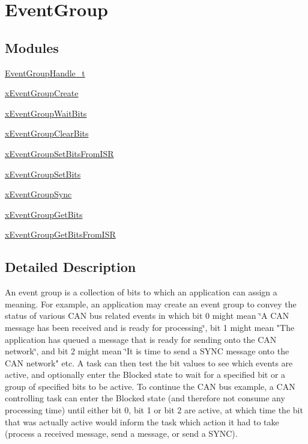 \hypertarget{group___event_group}{}\section{Event\+Group}
\label{group___event_group}
\subsection*{Modules}
\begin{DoxyCompactItemize}
\item 
\hyperlink{group___event_group_handle__t}{Event\+Group\+Handle\+\_\+t}
\item 
\hyperlink{group__x_event_group_create}{x\+Event\+Group\+Create}
\item 
\hyperlink{group__x_event_group_wait_bits}{x\+Event\+Group\+Wait\+Bits}
\item 
\hyperlink{group__x_event_group_clear_bits}{x\+Event\+Group\+Clear\+Bits}
\item 
\hyperlink{group__x_event_group_set_bits_from_i_s_r}{x\+Event\+Group\+Set\+Bits\+From\+I\+SR}
\item 
\hyperlink{group__x_event_group_set_bits}{x\+Event\+Group\+Set\+Bits}
\item 
\hyperlink{group__x_event_group_sync}{x\+Event\+Group\+Sync}
\item 
\hyperlink{group__x_event_group_get_bits}{x\+Event\+Group\+Get\+Bits}
\item 
\hyperlink{group__x_event_group_get_bits_from_i_s_r}{x\+Event\+Group\+Get\+Bits\+From\+I\+SR}
\end{DoxyCompactItemize}


\subsection{Detailed Description}
An event group is a collection of bits to which an application can assign a meaning. For example, an application may create an event group to convey the status of various C\+AN bus related events in which bit 0 might mean \char`\"{}\+A C\+A\+N
message has been received and is ready for processing\char`\"{}, bit 1 might mean "The application has queued a message that is ready for sending onto the C\+AN network\char`\"{}, and bit 2 might mean \char`\"{}It is time to send a S\+Y\+NC message onto the C\+AN network" etc. A task can then test the bit values to see which events are active, and optionally enter the Blocked state to wait for a specified bit or a group of specified bits to be active. To continue the C\+AN bus example, a C\+AN controlling task can enter the Blocked state (and therefore not consume any processing time) until either bit 0, bit 1 or bit 2 are active, at which time the bit that was actually active would inform the task which action it had to take (process a received message, send a message, or send a S\+Y\+NC).

